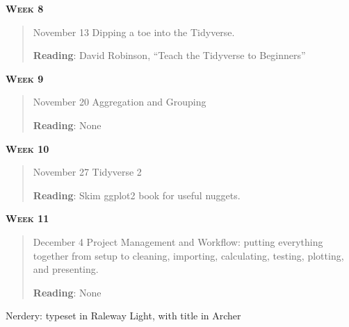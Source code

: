 \documentclass[11pt,letterpaper]{article}
\begin{document}
\textbf{\textsc{Week 8}}
		\begin{quote}	
		November 13  \textbullet \space Dipping a toe into the Tidyverse. 
		
		\textbf{Reading}: David Robinson, ``Teach the Tidyverse to Beginners''
		\end{quote}

\textbf{\textsc{Week 9}}
		\begin{quote}	
		November 20  \textbullet \space Aggregation and Grouping 
		
		\textbf{Reading}: None
		\end{quote}

\textbf{\textsc{Week 10}}
		\begin{quote}	
		November 27 \textbullet \space Tidyverse 2
		
		\textbf{Reading}:  Skim ggplot2 book for useful nuggets.
		\end{quote}

\textbf{\textsc{Week 11}}
		\begin{quote}	
		December  4 \textbullet \space Project Management and Workflow: putting everything together from setup to cleaning, importing, calculating, testing, plotting, and presenting. 
		
		\textbf{Reading}:  None 
		\end{quote}



\vfill
{\tiny Nerdery: typeset in Raleway Light, with title in Archer}
\end{document}
